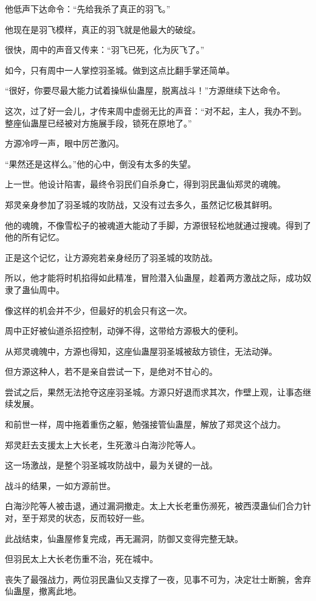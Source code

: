 \begin{this_body}
他低声下达命令：“先给我杀了真正的羽飞。”

他现在是羽飞模样，真正的羽飞就是他最大的破绽。

很快，周中的声音又传来：“羽飞已死，化为灰飞了。”

如今，只有周中一人掌控羽圣城。做到这点比翻手掌还简单。

“很好，你要尽最大能力试着操纵仙蛊屋，脱离战斗！”方源继续下达命令。

这次，过了好一会儿，才传来周中虚弱无比的声音：“对不起，主人，我办不到。整座仙蛊屋已经被对方施展手段，锁死在原地了。”

方源冷哼一声，眼中厉芒激闪。

“果然还是这样么。”他的心中，倒没有太多的失望。

上一世。他设计陷害，最终令羽民们自杀身亡，得到羽民蛊仙郑灵的魂魄。

郑灵亲身参加了羽圣城的攻防战，又没有过去多久，虽然记忆极其鲜明。

他的魂魄，不像雪松子的被魂道大能动了手脚，方源很轻松地就通过搜魂。得到了他的所有记忆。

正是这个记忆，让方源宛若亲身经历了羽圣城的攻防战。

所以，他才能将时机掐得如此精准，冒险潜入仙蛊屋，趁着两方激战之际，成功奴隶了蛊仙周中。

像这样的机会并不少，但最好的机会只有这一次。

周中正好被仙道杀招控制，动弹不得，这带给方源极大的便利。

从郑灵魂魄中，方源也得知，这座仙蛊屋羽圣城被敌方锁住，无法动弹。

但方源这种人，若不是亲自尝试一下，是绝对不甘心的。

尝试之后，果然无法抢夺这座羽圣城。方源只好退而求其次，作壁上观，让事态继续发展。

和前世一样，周中拖着重伤之躯，勉强接管仙蛊屋，解放了郑灵这个战力。

郑灵赶去支援太上大长老，生死激斗白海沙陀等人。

这一场激战，是整个羽圣城攻防战中，最为关键的一战。

战斗的结果，一如方源前世。

白海沙陀等人被击退，通过漏洞撤走。太上大长老重伤濒死，被西漠蛊仙们合力针对，至于郑灵的状态，反而较好一些。

此战结束，仙蛊屋修复完成，再无漏洞，防御又变得完整无缺。

但羽民太上大长老伤重不治，死在城中。

丧失了最强战力，两位羽民蛊仙又支撑了一夜，见事不可为，决定壮士断腕，舍弃仙蛊屋，撤离此地。


\end{this_body}
